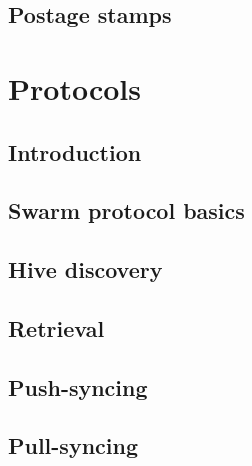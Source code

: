 \section{Postage stamps \statusorange}\label{spec:format:postage-stamps}

%


\chapter{Protocols}\label{spec:protocol}

\section{Introduction \statusorange}\label{spec:protocol:intro}


\section{Swarm protocol basics\statusgreen}\label{spec:protocol:basics}


\section{Hive discovery  \statusgreen}\label{spec:protocol:hive}


\section{Retrieval  \statusorange  \statuspriority}\label{spec:protocol:retrieval}


\section{Push-syncing  \statusorange  \statuspriority}\label{spec:protocol:push-sync}


\section{Pull-syncing \statusorange  \statuspriority}\label{spec:protocol:pull-sync}


